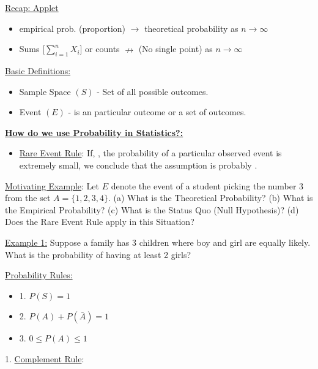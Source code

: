 \documentclass[handout]{ximera}
\newcommand {\bi} {\begin{itemize}}
\newcommand {\ei} {\end{itemize}}
\begin{document}
 \item \underline{Recap: Applet}
     \bi
      \item[]  empirical prob. (proportion) $\rightarrow$ theoretical probability as $n \rightarrow \infty$
      \item[]  Sums [$\sum_{i=1}^n X_i$] or counts $\nrightarrow$ (No single point) as $n \rightarrow \infty$
     \ei

 \item \underline{Basic Definitions:}
   \bi
    \item Sample Space $(S)$ - Set of all possible outcomes.
    \item Event $(E)$ - is an particular outcome or a set of outcomes.
   \ei

 \newpage

 \item \underline{\textbf{{\color{blue} How do we use Probability in Statistics?:}}}
   \bi
    \item \underline{Rare Event Rule}: If, \underline{\makebox[3in][c]{ }}, the probability of a particular observed event is extremely small, we conclude that the assumption is probably \underline{\makebox[2in][c]{ }}.
   \ei
  \item[] \underline{Motivating Example}: Let $E$ denote the event of a student picking the number 3 from the set $A = \{1,2,3,4\}$. (a) What is the Theoretical Probability? (b) What is the Empirical Probability? (c) What is the Status Quo (Null Hypothesis)? (d) Does the Rare Event Rule apply in this Situation?

\newpage


 \item[] \underline{Example 1:} Suppose a family has 3 children where boy and girl are equally likely. What is the probability of having at least 2 girls?


  \vspace{3.5in}


 \item \underline{Probability Rules:}

   \bi
    \item[1.] $P(S) = 1$
    \item[2.] $P(A) + P(\bar{A}) = 1$
    \item[3.] $0 \leq P(A) \leq 1$
   \ei

 \item[1.] \underline{Complement Rule}:

    \vspace{1.5in}
    
\end{document}
